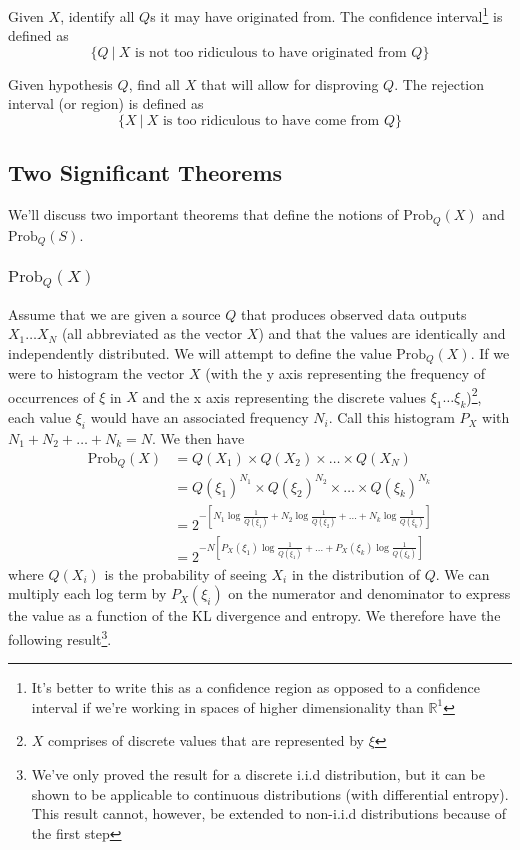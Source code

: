 \documentclass[11pt]{article}
\theoremstyle{definition}
\begin{document}
 Given $X$, identify all $Q$s it may have originated from. The confidence interval\footnote{It's better to write this as a confidence region as opposed to a confidence interval if we're working in spaces of higher dimensionality than $\mathbb{R}^1$} is defined as $$\{Q \: | \: X \text{ is not too ridiculous to have originated from } Q\}$$

 Given hypothesis $Q$, find all $X$ that will allow for disproving $Q$. The rejection interval (or region) is defined as $$\{X \: | \: X \text{ is too ridiculous to have come from } Q \}$$

\subsection{Two Significant Theorems}

We'll discuss two important theorems that define the notions of $\text{Prob}_Q(X)$ and $\text{Prob}_Q(S)$.

\subsubsection{$\text{Prob}_Q(X)$}
Assume that we are given a source $Q$ that produces observed data outputs $X_1 \dots X_N$ (all abbreviated as the vector $X$) and that the values are identically and independently distributed. We will attempt to define the value $\text{Prob}_Q(X)$. If we were to histogram the vector $X$ (with the y axis representing the frequency of occurrences of $\xi$ in $X$ and the x axis representing the discrete values $\xi_1 \dots \xi_k$)\footnote{$X$ comprises of discrete values that are represented by $\xi$}, each value $\xi_i$ would have an associated frequency $N_i$. Call this histogram $P_X$ with $N_1 + N_2 + \dots + N_k = N$. We then have 
\begin{align*}
\text{Prob}_Q(X) &= Q(X_1) \times Q(X_2) \times \dots \times Q(X_N) \\
	&= Q(\xi_1)^{N_1} \times Q(\xi_2)^{N_2} \times \dots \times Q(\xi_k)^{N_k} \\
	&= 2^{-[N_1 \log \frac{1}{Q(\xi_1)} + N_2 \log \frac{1}{Q(\xi_2)} + \dots + N_k \log \frac{1}{Q(\xi_k)}]} \\
	&= 2^{-N[P_X(\xi_1) \log \frac{1}{Q(\xi_1)} + \dots + P_X(\xi_k) \log \frac{1}{Q(\xi_k)}]} 
\end{align*}
where $Q(X_i)$ is the probability of seeing $X_i$ in the distribution of $Q$. We can multiply each log term by $P_X(\xi_i)$ on the numerator and denominator to express the value as a function of the KL divergence and entropy. We therefore have the following result\footnote{We've only proved the result for a discrete i.i.d distribution, but it can be shown to be applicable to continuous distributions (with differential entropy). This result cannot, however, be extended to non-i.i.d distributions because of the first step}.
\end{document}
